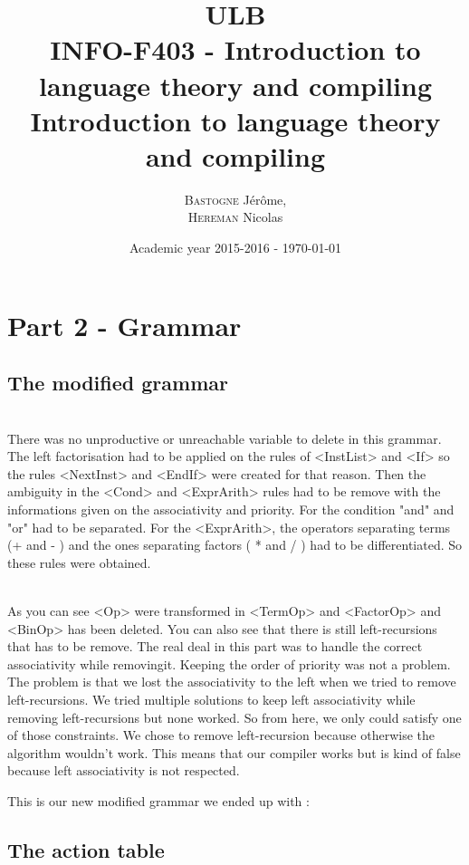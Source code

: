 \documentclass[a4paper,10pt]{report}
\title{ULB\\
        INFO-F403 - Introduction to language theory and compiling \\
            Introduction to language theory and compiling}
\author{\textsc{Bastogne} Jérôme,\\
        \textsc{Hereman} Nicolas}
\date{Academic year 2015-2016 - \today}
\begin{document}
\maketitle
\clearpage


\chapter*{Part 2 - Grammar}

\section*{The modified grammar}

\hfill \\
There was no unproductive or unreachable variable to delete in this grammar. The left factorisation had to be applied on the rules of <InstList> and <If> so the rules <NextInst> and <EndIf> were created for that reason. Then the ambiguity in the <Cond> and <ExprArith> rules had to be remove with the informations given on the associativity and priority. For the condition "and" and "or" had to be separated. For the <ExprArith>, the operators separating terms (+ and - ) and the ones separating factors ( * and / ) had to be differentiated. So these rules were obtained.



\hfill \\
As you can see <Op> were transformed in <TermOp> and <FactorOp> and <BinOp> has been deleted. You can also see that there is still left-recursions that has to be remove. The real deal in this part was to handle the correct associativity while removingit. Keeping the order of priority was not a problem. The problem is that we lost the associativity to the left when we tried to remove left-recursions. We tried multiple solutions to keep left associativity while removing left-recursions but none worked. So from here, we only could satisfy one of those constraints. We chose to remove left-recursion because otherwise the algorithm wouldn't work. This means that our compiler works but is kind of false because left associativity is not respected.

This is our new modified grammar we ended up with : \\




\section*{The action table}
\end{document}
